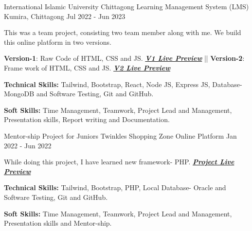 

\begin{cventries}

  \cventry
    {International Islamic University Chittagong} %
    {Learning Management System (LMS)} %
    {Kumira, Chittagong} %
    {Jul 2022 - Jun 2023} %
    {
      \begin{cvitems} %
        \item {This was a team project, consisting two team member along with me. We build this online platform in two versions.}
        \item {\textbf{Version-1}: Raw Code of HTML, CSS and JS. \textbf{\href{https://cps-22.netlify.app/}{\textit{V1 Live Preview}}} || \textbf{Version-2}: Frame work of HTML,  CSS and JS. \textbf{\href{https://choloprogrammingshikhi.vercel.app/}{\textit{V2 Live Preview}}}}
        \item {\textbf{Technical Skills:} Tailwind, Bootstrap, React, Node JS, Express JS, Database- MongoDB  and Software Testing, Git and GitHub.}
        \item {\textbf{Soft Skills:} Time Management, Teamwork, Project Lead and Management, Presentation skills, Report writing and Documentation.}
      \end{cvitems}
    }


  \cventry
    {Mentor-ship Project for Juniors} %
    {Twinkles Shopping Zone} %
    {Online Platform} %
    {Jan 2022 - Jun 2022} %
    {
      \begin{cvitems} %
        \item {While doing this project, I have learned new framework- PHP. \textbf{\href{https://sorowar-cse.github.io/Twinkles-Shopping-Zone-Full-Project/}{\textit{Project Live Preview}}}}
        \item {\textbf{Technical Skills:} Tailwind, Bootstrap, PHP, Local Database- Oracle  and Software Testing, Git and GitHub.}
        \item {\textbf{Soft Skills:} Time Management, Teamwork, Project Lead and Management, Presentation skills and Mentor-ship.}
      \end{cvitems}
    }


\end{cventries}

